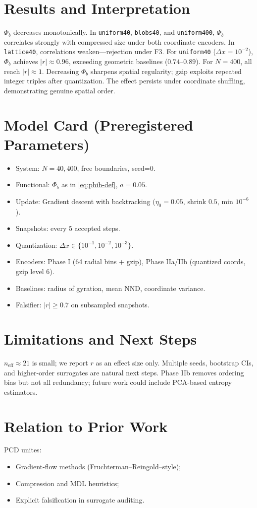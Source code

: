 \documentclass[11pt,a4paper]{article}
\numberwithin{equation}{section}
\newcommand{\phib}{\Phi_b}
\begin{document}
\section{Results and Interpretation}
$\phib$ decreases monotonically. In \texttt{uniform40}, \texttt{blobs40}, and \texttt{uniform400}, $\phib$ correlates strongly with compressed size under both coordinate encoders. In \texttt{lattice40}, correlations weaken—rejection under F3.  
For \texttt{uniform40} ($\Delta x=10^{-2}$), $\phib$ achieves $|r|\!\approx\!0.96$, exceeding geometric baselines ($0.74$–$0.89$).  
For $N{=}400$, all reach $|r|\!\approx\!1$.  
Decreasing $\phib$ sharpens spatial regularity; gzip exploits repeated integer triples after quantization. The effect persists under coordinate shuffling, demonstrating genuine spatial order.

\section{Model Card (Preregistered Parameters)}
\begin{itemize}
\item System: $N{=}40,400$, free boundaries, seed=0.
\item Functional: $\phib$ as in \cref{eq:phib-def}, $a{=}0.05$.
\item Update: Gradient descent with backtracking ($\eta_0{=}0.05$, shrink $0.5$, min $10^{-6}$).
\item Snapshots: every $5$ accepted steps.
\item Quantization: $\Delta x\in\{10^{-1},10^{-2},10^{-3}\}$.
\item Encoders: Phase I (64 radial bins + gzip), Phase IIa/IIb (quantized coords, gzip level 6).
\item Baselines: radius of gyration, mean NND, coordinate variance.
\item Falsifier: $|r|\ge0.7$ on subsampled snapshots.
\end{itemize}

\section{Limitations and Next Steps}
$n_\text{eff}\!\approx\!21$ is small; we report $r$ as an effect size only.  
Multiple seeds, bootstrap CIs, and higher-order surrogates are natural next steps.  
Phase IIb removes ordering bias but not all redundancy; future work could include PCA-based entropy estimators.

\section{Relation to Prior Work}
PCD unites:
\begin{itemize}
\item Gradient-flow methods (Fruchterman–Reingold–style);
\item Compression and MDL heuristics;
\item Explicit falsification in surrogate auditing.
\end{itemize}
\end{document}
